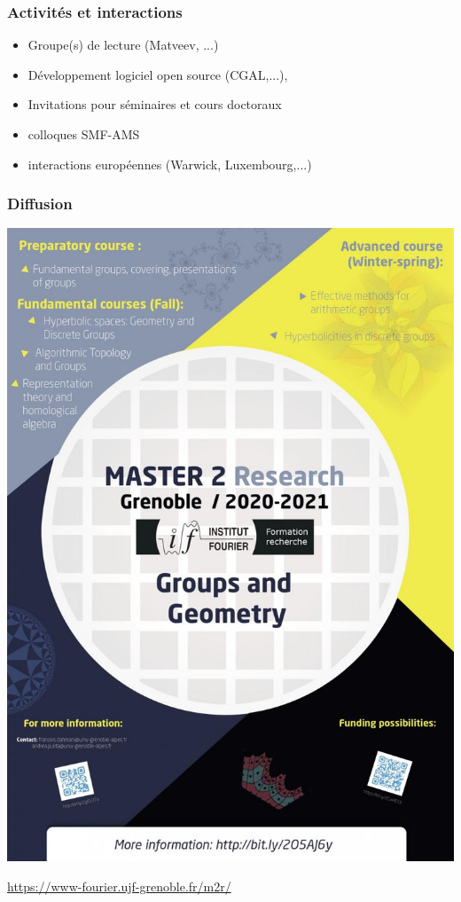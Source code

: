 \documentclass[a4paper,compress]{beamer}  %
\theoremstyle{definition}
\begin{document}
\begin{frame}
  \frametitle{Activités et interactions}
  \begin{itemize}
  \item Groupe(s) de lecture (Matveev, ...)
    \item Développement logiciel open source (CGAL,...),
\item Invitations pour séminaires et cours doctoraux
\item colloques SMF-AMS
\item interactions européennes (Warwick, Luxembourg,...)
  \end{itemize}
\end{frame}
\begin{frame}
  \frametitle{Diffusion}
\centerline{\includegraphics[height=.8\textheight]{POSTER-20-21.jpg}%
}
\centerline{\href{https://www-fourier.ujf-grenoble.fr/m2r/}{https://www-fourier.ujf-grenoble.fr/m2r/}}
\end{frame}
\end{document}
